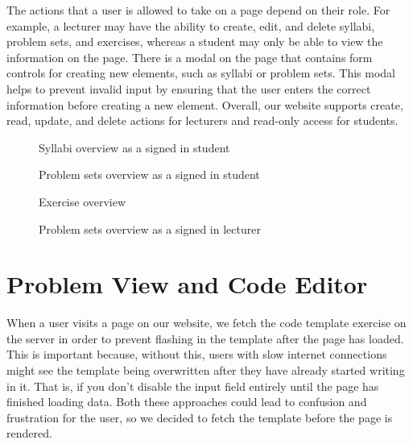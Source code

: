 The actions that a user is allowed to take on a page depend on their role. For example, a lecturer may have the ability to create, edit, and delete syllabi, problem sets, and exercises, whereas a student may only be able to view the information on the page.
There is a modal on the page that contains form controls for creating new elements, such as syllabi or problem sets.
This modal helps to prevent invalid input by ensuring that the user enters the correct information before creating a new element.
Overall, our website supports create, read, update, and delete actions for lecturers and read-only access for students.

\begin{figure}[H]
    \centering
    \caption{Syllabi overview as a signed in student}
    \label{fig:syllabi}
\end{figure}

\begin{figure}[H]
    \centering
    \caption{Problem sets overview as a signed in student}
    \label{fig:problemsets}
\end{figure}

\begin{figure}[H]
    \centering
    \caption{Exercise overview}
    \label{fig:exercise_overview}
\end{figure}

\begin{figure}[H]
    \centering
    \caption{Problem sets overview as a signed in lecturer}
    \label{fig:problemsets_teacher_view}
\end{figure}

\section{Problem View and Code Editor}
When a user visits a page on our website, we fetch the code template exercise on the server in order to prevent flashing in the template after the page has loaded.
This is important because, without this, users with slow internet connections might see the template being overwritten after they have already started writing in it. That is, if you don't disable the input field entirely until the page has finished loading data. Both these approaches could lead to confusion and frustration for the user, so we decided to fetch the template before the page is rendered.

